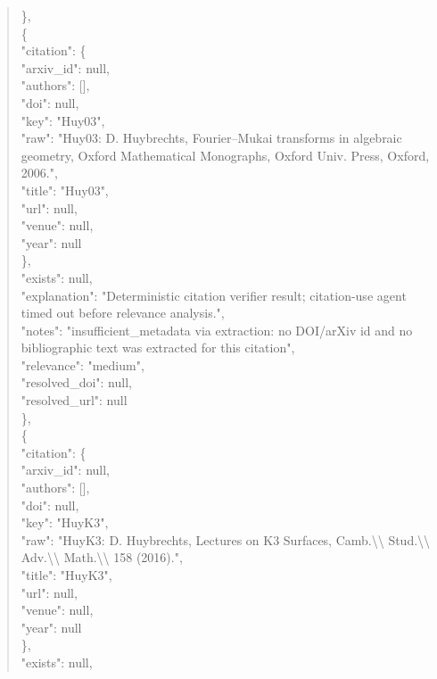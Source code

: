 \documentclass[11pt]{article}
\begin{document}
\begin{quote}
    \},\\
    \{\\
      "citation": \{\\
        "arxiv\_id": null,\\
        "authors": [],\\
        "doi": null,\\
        "key": "Huy03",\\
        "raw": "Huy03: D. Huybrechts, Fourier--Mukai transforms in algebraic geometry, Oxford Mathematical Monographs, Oxford Univ. Press, Oxford, 2006.",\\
        "title": "Huy03",\\
        "url": null,\\
        "venue": null,\\
        "year": null\\
      \},\\
      "exists": null,\\
      "explanation": "Deterministic citation verifier result; citation-use agent timed out before relevance analysis.",\\
      "notes": "insufficient\_metadata via extraction: no DOI/arXiv id and no bibliographic text was extracted for this citation",\\
      "relevance": "medium",\\
      "resolved\_doi": null,\\
      "resolved\_url": null\\
    \},\\
    \{\\
      "citation": \{\\
        "arxiv\_id": null,\\
        "authors": [],\\
        "doi": null,\\
        "key": "HuyK3",\\
        "raw": "HuyK3: D. Huybrechts, Lectures on K3 Surfaces, Camb.\textbackslash{}\textbackslash{} Stud.\textbackslash{}\textbackslash{} Adv.\textbackslash{}\textbackslash{} Math.\textbackslash{}\textbackslash{} 158 (2016).",\\
        "title": "HuyK3",\\
        "url": null,\\
        "venue": null,\\
        "year": null\\
      \},\\
      "exists": null,\\

\end{quote}
\end{document}
